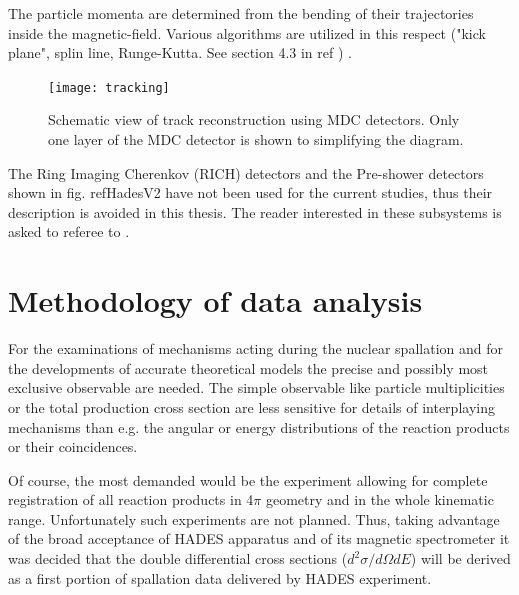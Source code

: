 The particle momenta are determined from the bending of their trajectories inside the magnetic-field. Various algorithms 
are utilized in this respect ("kick plane", splin line, Runge-Kutta. See section 4.3 in ref \cite{agakichiev2009HADES}) . 

\begin{figure}[!h]
	\centering
	\texttt{[image: tracking]}
	\caption{Schematic view of track reconstruction using MDC detectors. Only one layer of the MDC detector is shown to simplifying the diagram.  }
	\label{tracking}
\end{figure}
 
 
The Ring Imaging Cherenkov (RICH) detectors and the Pre-shower detectors shown in fig. ref{HadesV2} have not been used for the current studies, 
thus their description is avoided in this thesis. The reader interested in these subsystems is asked to referee to \cite{agakichiev2009HADES}.

\section{\label{Analysis} Methodology of data analysis}

For the examinations of mechanisms acting during the nuclear spallation and for the developments of accurate theoretical models  
the precise and possibly most exclusive observable are needed.
The simple observable like particle multiplicities or the total production cross section are less sensitive for details 
of interplaying mechanisms than e.g. the angular or energy distributions of the reaction products or their coincidences.

Of course, the most demanded would be the experiment allowing for complete registration of all reaction products 
in 4$\pi$ geometry and in the whole kinematic range. Unfortunately such experiments are not planned. 
Thus, taking advantage of the broad acceptance of HADES apparatus and of its magnetic spectrometer 
it was decided that the double differential cross sections ($d^2\sigma/d\Omega dE$) will be derived as a 
first portion of spallation data delivered by HADES experiment. 

